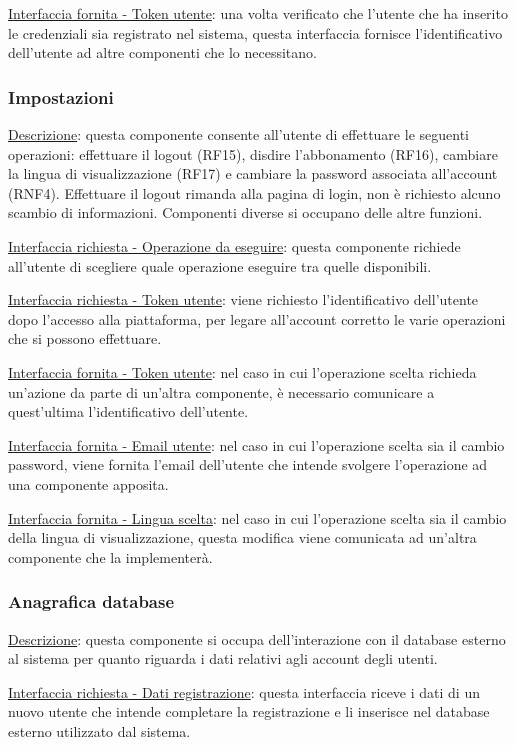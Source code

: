 \documentclass[a4paper,12pt]{article}
\begin{document}
\underline{Interfaccia fornita - Token utente}: una volta verificato che l’utente che ha inserito le credenziali sia registrato nel sistema, questa interfaccia fornisce l’identificativo dell’utente ad altre componenti che lo necessitano.

\subsubsection{Impostazioni}

\underline{Descrizione}: questa componente consente all’utente di effettuare le seguenti operazioni: effettuare il logout (RF15), disdire l’abbonamento (RF16), cambiare la lingua di visualizzazione (RF17) e cambiare la password associata all’account (RNF4). Effettuare il logout rimanda alla pagina di login, non è richiesto alcuno scambio di informazioni. Componenti diverse si occupano delle altre funzioni.

\underline{Interfaccia richiesta - Operazione da eseguire}: questa componente richiede all’utente di scegliere quale operazione eseguire tra quelle disponibili.

\underline{Interfaccia richiesta - Token utente}: viene richiesto l’identificativo dell’utente dopo l’accesso alla piattaforma, per legare all’account corretto le varie operazioni che si possono effettuare.

\underline{Interfaccia fornita - Token utente}: nel caso in cui l’operazione scelta richieda un’azione da parte di un’altra componente, è necessario comunicare a quest’ultima l’identificativo dell’utente.

\underline{Interfaccia fornita - Email utente}: nel caso in cui l’operazione scelta sia il cambio password, viene fornita l’email dell’utente che intende svolgere l’operazione ad una componente apposita.

\underline{Interfaccia fornita - Lingua scelta}: nel caso in cui l’operazione scelta sia il cambio della lingua di visualizzazione, questa modifica viene comunicata ad un’altra componente che la implementerà.

\subsubsection{Anagrafica database}

\underline{Descrizione}: questa componente si occupa dell’interazione con il database esterno al sistema per quanto riguarda i dati relativi agli account degli utenti.

\underline{Interfaccia richiesta - Dati registrazione}: questa interfaccia riceve i dati di un nuovo utente che intende completare la registrazione e li inserisce nel database esterno utilizzato dal sistema.
\end{document}
